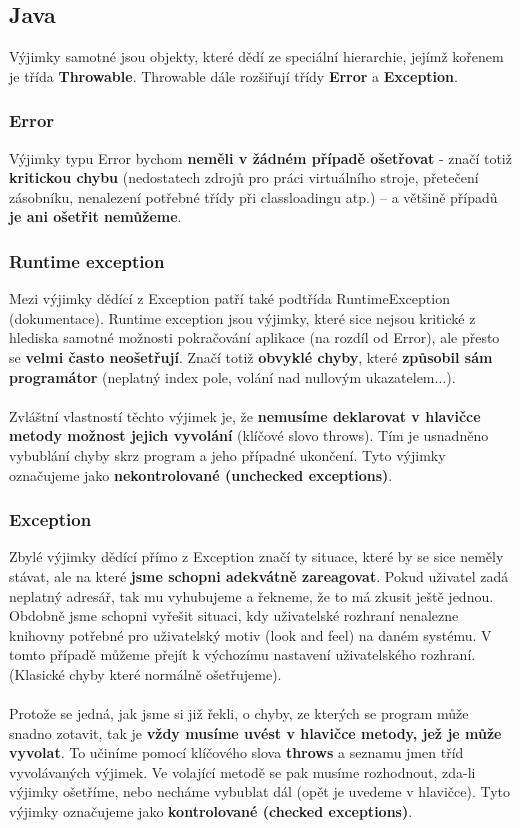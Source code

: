 \subsection{Java}
Výjimky samotné jsou objekty, které dědí ze speciální hierarchie, jejímž kořenem je třída \textbf{Throwable}. Throwable dále rozšiřují třídy \textbf{Error} a \textbf{Exception}.

\subsubsection{Error}
Výjimky typu Error bychom \textbf{neměli v žádném případě ošetřovat} - značí totiž \textbf{kritickou chybu} (nedostatech zdrojů pro práci virtuálního stroje, přetečení zásobníku, nenalezení potřebné třídy při classloadingu atp.) – a většině případů \textbf{je ani ošetřit nemůžeme}.

\subsubsection{Runtime exception}
Mezi výjimky dědící z Exception patří také podtřída RuntimeException (dokumentace). Runtime exception jsou výjimky, které sice nejsou kritické z hlediska samotné možnosti pokračování aplikace (na rozdíl od Error), ale přesto se \textbf{velmi často neošetřují}. Značí totiž \textbf{obvyklé chyby}, které \textbf{způsobil sám programátor} (neplatný index pole, volání nad nullovým ukazatelem...).
\\\\
Zvláštní vlastností těchto výjimek je, že \textbf{nemusíme deklarovat v hlavičce metody možnost jejich vyvolání} (klíčové slovo throws). Tím je usnadněno vybublání chyby skrz program a jeho případné ukončení. Tyto výjimky označujeme jako \textbf{nekontrolované (unchecked exceptions)}.

\subsubsection{Exception}
Zbylé výjimky dědící přímo z Exception značí ty situace, které by se sice neměly stávat, ale na které \textbf{jsme schopni adekvátně zareagovat}. Pokud uživatel zadá neplatný adresář, tak mu vyhubujeme a řekneme, že to má zkusit ještě jednou. Obdobně jsme schopni vyřešit situaci, kdy uživatelské rozhraní nenalezne knihovny potřebné pro uživatelský motiv (look and feel) na daném systému. V tomto případě můžeme přejít k výchozímu nastavení uživatelského rozhraní. (Klasické chyby které normálně ošetřujeme).
\\\\
Protože se jedná, jak jsme si již řekli, o chyby, ze kterých se program může snadno zotavit, tak je \textbf{vždy musíme uvést v hlavičce metody, jež je může vyvolat}. To učiníme pomocí klíčového slova \textbf{throws} a seznamu jmen tříd vyvolávaných výjimek. Ve volající metodě se pak musíme rozhodnout, zda-li výjimky ošetříme, nebo necháme vybublat dál (opět je uvedeme v hlavičce).
Tyto výjimky označujeme jako \textbf{kontrolované (checked exceptions)}.

